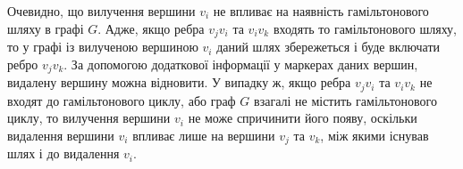 \documentclass[a4paper,14pt,ukrainian]{extarticle}
\begin{document}
    Очевидно, що вилучення вершини $v_i$ не впливає на наявність гамільтонового шляху в графі $G$.
    Адже, якщо ребра $v_j$$v_i$ та $v_i$$v_k$ входять то гамільтонового шляху, то у графі із вилученою вершиною $v_i$ даний шлях збережеться і буде включати ребро $v_j$$v_k$.
    За допомогою додаткової інформації у маркерах даних вершин, видалену вершину можна відновити.
    У випадку ж, якщо ребра $v_j$$v_i$ та $v_i$$v_k$ не входят до гамільтонового циклу, або граф $G$ взагалі не містить гамільтонового циклу, то вилучення вершини $v_i$ не може спричинити його появу, оскільки видалення вершини $v_i$ впливає лише на вершини $v_j$ та $v_k$, між якими існував шлях і до видалення $v_i$.
\end{document}
